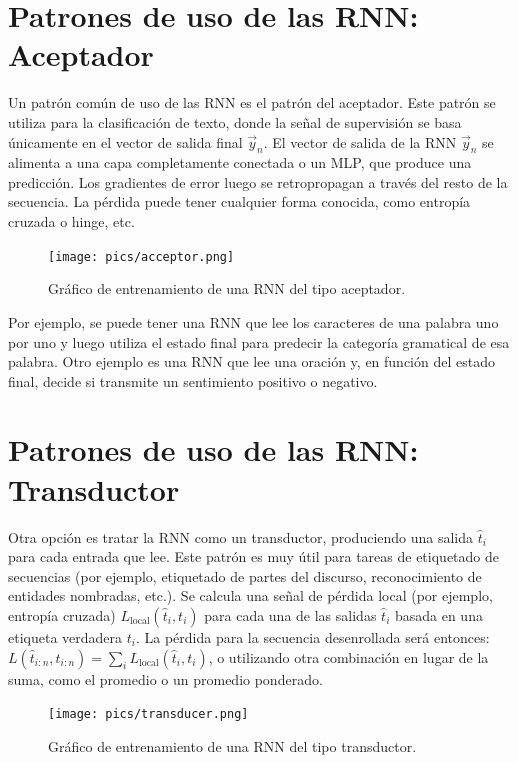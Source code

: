 \section{Patrones de uso de las RNN: Aceptador}

Un patrón común de uso de las RNN es el patrón del aceptador. Este patrón se utiliza para la clasificación de texto, donde la señal de supervisión se basa únicamente en el vector de salida final $\vec{y}_n$. El vector de salida de la RNN $\vec{y}_n$ se alimenta a una capa completamente conectada o un MLP, que produce una predicción. Los gradientes de error luego se retropropagan a través del resto de la secuencia. La pérdida puede tener cualquier forma conocida, como entropía cruzada o hinge, etc.

\begin{figure}[h]
  \centering
  \texttt{[image: pics/acceptor.png]}
  \caption{Gráfico de entrenamiento de una RNN del tipo aceptador.}
\end{figure}

Por ejemplo, se puede tener una RNN que lee los caracteres de una palabra uno por uno y luego utiliza el estado final para predecir la categoría gramatical de esa palabra. Otro ejemplo es una RNN que lee una oración y, en función del estado final, decide si transmite un sentimiento positivo o negativo.

\section{Patrones de uso de las RNN: Transductor}

Otra opción es tratar la RNN como un transductor, produciendo una salida $\hat{t}_i$ para cada entrada que lee. Este patrón es muy útil para tareas de etiquetado de secuencias (por ejemplo, etiquetado de partes del discurso, reconocimiento de entidades nombradas, etc.). Se calcula una señal de pérdida local (por ejemplo, entropía cruzada) $L_{\text{local}}(\hat{t}_{i},{t}_{i})$ para cada una de las salidas $\hat{t}_{i}$ basada en una etiqueta verdadera ${t}_{i}$. La pérdida para la secuencia desenrollada será entonces: $L(\hat{t}_{i:n},{t}_{i:n}) = \sum_{i}L_{\text{{local}}}(\hat{t}_{i},{t}_{i})$, o utilizando otra combinación en lugar de la suma, como el promedio o un promedio ponderado.

\begin{figure}[h]
  \centering
  \texttt{[image: pics/transducer.png]}
  \caption{Gráfico de entrenamiento de una RNN del tipo transductor.}
\end{figure}

